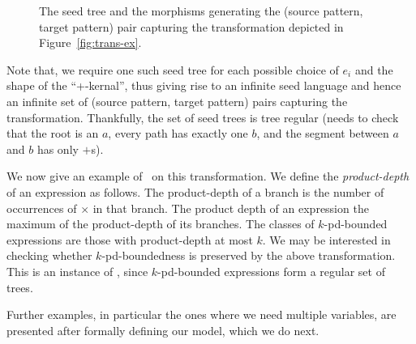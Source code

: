 \begin{figure}
    \caption{The seed tree and the morphisms generating the (source pattern, target pattern) pair capturing the transformation depicted in Figure~\ref{fig:trans-ex}.}\label{fig:seed-tree}
\end{figure}

Note that, we require one such seed tree for each possible choice of $e_i$ and the shape of the ``+-kernal'', thus giving rise to an infinite seed language and hence an infinite set of (source pattern, target pattern) pairs capturing the transformation. Thankfully, the set of seed trees is tree regular (needs to check that the root is an $a$, every path has exactly one $b$, and the segment between $a$ and $b$ has only $+$s).

\medskip

We now give an example of \tcp\ on this transformation. We define the \emph{product-depth} of an expression as follows. The product-depth of a branch is the number of occurrences of $\times$ in that branch. The product depth of an expression the maximum of the product-depth of its branches. The classes of $k$-pd-bounded expressions are those with product-depth at most $k$. We  may be interested in checking whether $k$-pd-boundedness is preserved by the above transformation. This is an instance of \tcp, since $k$-pd-bounded expressions form a regular set of trees.

Further examples, in particular the ones where we need multiple variables, are presented after formally defining our model, which we do next.